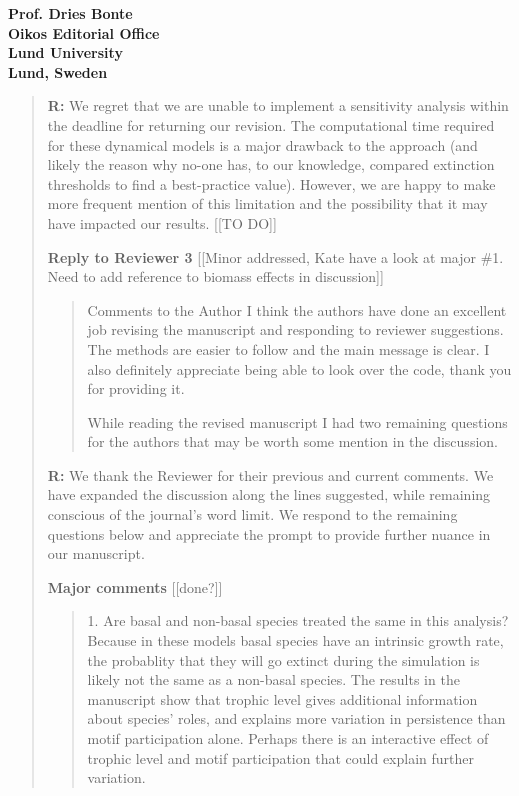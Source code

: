 \documentclass[12pt]{letter}
\begin{document}
\begin{letter}{\bf Prof. Dries Bonte\\
Oikos Editorial Office \\
Lund University \\
Lund, Sweden}
\begin{quotation}
    \textbf{R:} We regret that we are unable to implement a sensitivity analysis within the deadline for returning our revision. The computational time required for these dynamical models is a major drawback to the approach (and likely the reason why no-one has, to our knowledge, compared extinction thresholds to find a best-practice value). However, we are happy to make more frequent mention of this limitation and the possibility that it may have impacted our results. [[TO DO]]

\clearpage


{\large \textbf{Reply to Reviewer 3}} [[Minor addressed, Kate have a look at major \#1. Need to add reference to biomass effects in discussion]]

  \begin{quotation}
    Comments to the Author
    I think the authors have done an excellent job revising the manuscript and responding to reviewer suggestions. The methods are easier to follow and the main message is clear. I also definitely appreciate being able to look over the code, thank you for providing it.   

    While reading the revised manuscript I had two remaining questions for the authors that may be worth some mention in the discussion. 

  \end{quotation}

  \smallskip

  \textbf{R:} We thank the Reviewer for their previous and current comments. We have expanded the discussion along the lines suggested, while remaining conscious of the journal's word limit. We respond to the remaining questions below and appreciate the prompt to provide further nuance in our manuscript.

  \smallskip

  \textbf{Major comments} [[done?]]

    \begin{quotation}
      1. Are basal and non-basal species treated the same in this analysis? Because in these models basal species have an intrinsic growth rate, the probablity that they will go extinct during the simulation is likely not the same as a non-basal species. The results in the manuscript show that trophic level gives additional information about species' roles, and explains more variation in persistence than motif participation alone. Perhaps there is an interactive effect of trophic level and motif participation that could explain further variation.
    \end{quotation}


\end{quotation}
\end{letter}
\end{document}

